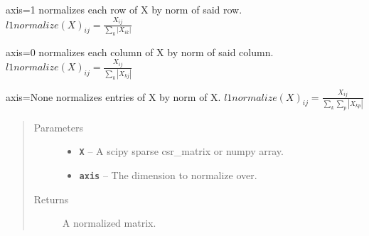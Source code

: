 \documentclass[letterpaper,10pt,english]{sphinxmanual}
\begin{document}

\begin{fulllineitems}
\label{loader:loader.l1normalize}
axis=1 normalizes each row of X by norm of said row. \(l1normalize(X)_{ij} = \frac{X_{ij}}{\sum_k |X_{ik}|}\)

axis=0 normalizes each column of X by norm of said column. \(l1normalize(X)_{ij} = \frac{X_{ij}}{\sum_k
|X_{kj}|}\)

axis=None normalizes entries of X  by norm of X. \(l1normalize(X)_{ij} = \frac{X_{ij}}{\sum_k \sum_p
|X_{kp}|}\)
\begin{quote}\begin{description}
\item[{Parameters}] \leavevmode\begin{itemize}
\item {} 
\textbf{\texttt{X}} -- A scipy sparse csr\_matrix or numpy array.

\item {} 
\textbf{\texttt{axis}} -- The dimension to normalize over.

\end{itemize}

\item[{Returns}] \leavevmode
A normalized matrix.

\end{description}\end{quote}

\end{fulllineitems}

\end{document}
